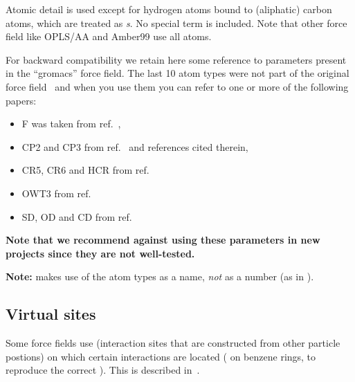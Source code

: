 Atomic detail is used except for hydrogen atoms bound to (aliphatic)
carbon atoms, which are treated as {\em {}s}. No
special  term is included. Note that other force field
like OPLS/AA and Amber99 use all atoms.

For backward compatibility we retain here some reference to parameters
present in the ``gromacs'' force field. The last 10 atom types were
not part of the original  force field~\cite{biomos} and
when you use them you can refer to one or more of the following
papers:
\begin{itemize}
\item F was taken from ref.~\cite{Buuren93a}, 
\item CP2 and CP3 from ref.~\cite{Buuren93b} and references cited therein, 
\item CR5, CR6 and HCR from ref.~\cite{Spoel96c}
\item OWT3 from ref.~\cite{Jorgensen83}
\item SD, OD and CD from ref.~\cite{Liu95}
\end{itemize}
{\bf Note that we recommend against using these parameters in new projects
since they are not well-tested.}

{\bf Note:} {\gromacs} makes use of the atom types as a name, {\em
not} as a number (as {\eg} in {\gromos}).

%
%

\subsection{Virtual sites}
\label{sec:vsitetop}
Some force fields use 
(interaction sites that are constructed from other particle postions)
on which certain interactions are located
({\eg} on benzene rings, to reproduce the correct
). This is described in~.

